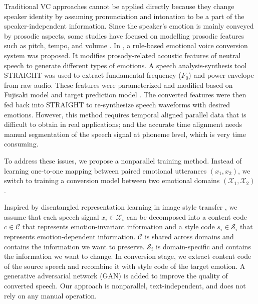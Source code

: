\documentclass{article}
\begin{document}

Traditional VC approaches cannot be applied directly because they change speaker identity by assuming pronunciation and intonation to be a part of the speaker-independent information. Since the speaker's emotion is mainly conveyed by prosodic aspects, some studies have focused on modelling prosodic features such as pitch, tempo, and volume \cite{wang2012emotional,wang2014multi}. In \cite{xue2018voice}, a rule-based emotional voice conversion system was proposed. It modifies prosody-related acoustic features of neutral speech to generate different types of emotions. A speech analysis-synthesis tool STRAIGHT \cite{kawahara1999restructuring} was used to extract fundamental frequency ($F_0$) and power envelope from raw audio. These features were parameterized and modified based on Fujisaki model \cite{fujisaki1984analysis} and target prediction model \cite{xue2016study}. The converted features were then fed back into STRAIGHT to re-synthesize speech waveforms with desired emotions. However, this method requires temporal aligned parallel data that is difficult to obtain in real applications; and the accurate time alignment needs manual segmentation of the speech signal at phoneme level, which is very time consuming.

To address these issues, we propose a nonparallel training method. Instead of learning one-to-one mapping between paired emotional utterances $(x_1, x_2)$, we switch to training a conversion model between two emotional domains $(\mathcal{X}_1, \mathcal{X}_2)$.

Inspired by disentangled representation learning in image style transfer \cite{gatys2016image,Huang_2018_ECCV}, we assume that each speech signal $x_i \in \mathcal{X}_i$ can be decomposed into a content code $c \in \mathcal{C}$ that represents emotion-invariant information and a style code $s_i \in \mathcal{S}_i$ that represents emotion-dependent information. $\mathcal{C}$ is shared across domains and contains the information we want to preserve. $\mathcal{S}_i$ is domain-specific and contains the information we want to change. In conversion stage, we extract content code of the source speech and recombine it with style code of the target emotion. A generative adversarial network (GAN) \cite{goodfellow2014generative} is added to improve the quality of converted speech. Our approach is nonparallel, text-independent, and does not rely on any manual operation.
\end{document}
